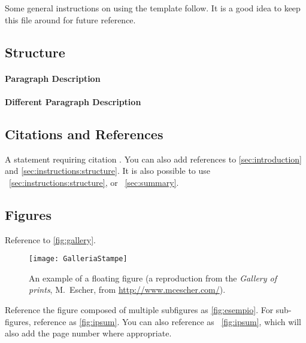 Some general instructions on using the template follow.
It is a good idea to keep this file around for future reference.


\subsection{Structure}
\label{sec:instructions:structure}
\lipsum[5] %

\paragraph{Paragraph Description} \lipsum[7] %

\paragraph{Different Paragraph Description} \lipsum[8] %


\subsection{Citations and References}
\label{sec:instructions:references}
A statement requiring citation \cite{Figueredo:2009dg}.
You can also add references to \autoref{sec:introduction} and \autoref{sec:instructions:structure}.
It is also possible to use \sectionautorefname~\vref{sec:instructions:structure},
or \sectionautorefname~\vref{sec:summary}.


\subsection{Figures}
\label{sec:instructions:figures}

Reference to \autoref{fig:gallery}.

\begin{figure}[tb]
\centering
\texttt{[image: GalleriaStampe]}
\caption[An example of a floating figure]{
  An example of a floating figure (a reproduction from the
  \emph{Gallery of prints}, M.~Escher,
  from \url{http://www.mcescher.com/}).
}
\label{fig:gallery}
\end{figure}

Reference the figure composed of multiple subfigures as \autoref{fig:esempio}.
For sub-figures, reference as \autoref{fig:ipsum}.
You can also reference as \figureautorefname~\vref{fig:ipsum},
which will also add the page number where appropriate.


